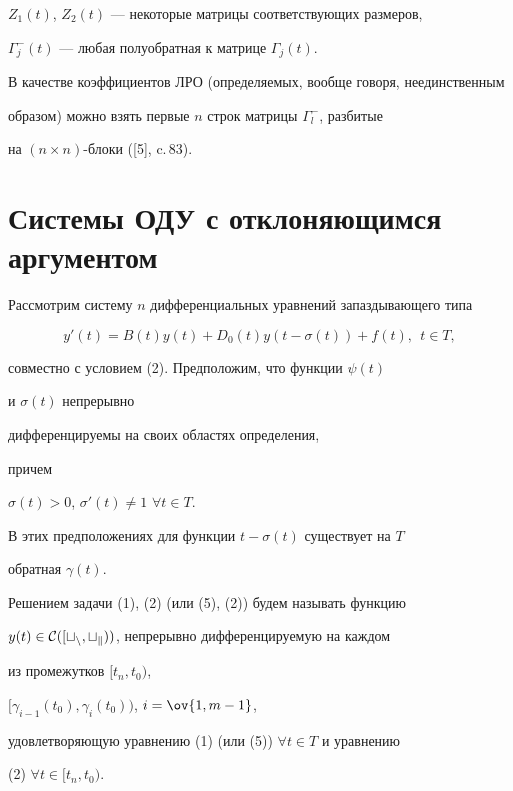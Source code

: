 $Z_1(t)$, $Z_2(t)$ --- некоторые матрицы соответствующих размеров,


$\Gamma^-_j(t)$ --- любая полуобратная к матрице $\Gamma_j(t)$.


В качестве коэффициентов ЛРО (определяемых, вообще говоря, неединственным


образом) можно взять первые $n$ строк матрицы $\Gamma^-_l$, разбитые


на $(n \times n)$-блоки ([5], c.\,83).





\section{Системы ОДУ с отклоняющимся аргументом}





Рассмотрим систему $n$ дифференциальных уравнений запаздывающего типа


\begin{equation}


y'(t)=B(t)y(t)+D_0(t)y(t- \sigma(t)) + f(t),\ \ t \in T,


\end{equation}


совместно с условием (2). Предположим, что функции $\psi (t)$


и $\sigma(t)$ непрерывно


дифференцируемы на своих областях определения,


причем


$\sigma(t) > 0$, $\sigma'(t) \ne 1$ $\forall t\in T$.


В этих предположениях для функции $t-\sigma (t)$ существует на $T$


обратная $\gamma(t)$.





\begin{defn}


Решением задачи (1), (2) (или (5), (2)) будем называть функцию


$y(t)\in\cal C([t_n,t_k))$, непрерывно дифференцируемую на каждом


из промежутков $[t_n,t_0)$,


$[\gamma_{i-1}(t_0),\gamma_i(t_0))$, $i=\ov{1,m-1}$,


удовлетворяющую уравнению (1) (или (5)) $\forall t\in T$ и уравнению


(2) $\forall t\in[t_n,t_0)$.


\end{defn}





